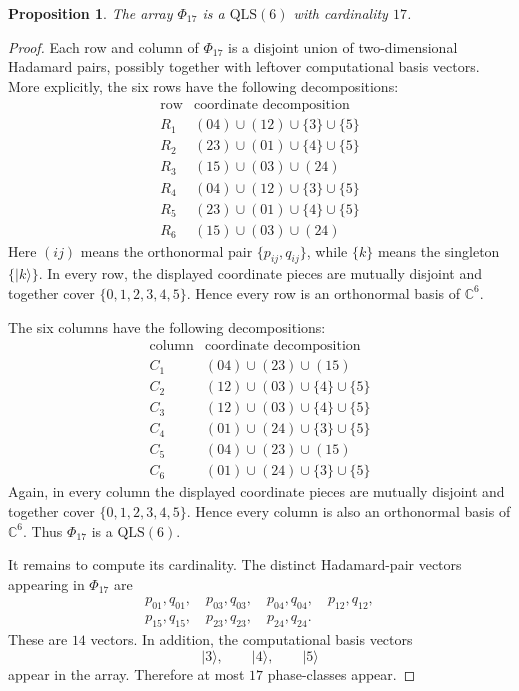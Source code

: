 \documentclass[a4paper,11pt]{article}
\newcommand{\C}{\mathbb{C}}
\newcommand{\ket}[1]{\lvert #1\rangle}
\newcommand{\QLS}{\mathrm{QLS}}
\newtheorem{proposition}{Proposition}
\begin{document}
\begin{proposition}
The array $\Phi_{17}$ is a $\QLS(6)$ with cardinality $17$.
\end{proposition}

\begin{proof}
Each row and column of $\Phi_{17}$ is a disjoint union of two-dimensional
Hadamard pairs, possibly together with leftover computational basis vectors.
More explicitly, the six rows have the following decompositions:
\[
\begin{array}{c|c}
\text{row} & \text{coordinate decomposition} \\\hline
R_1 & (04)\cup(12)\cup\{3\}\cup\{5\}\\
R_2 & (23)\cup(01)\cup\{4\}\cup\{5\}\\
R_3 & (15)\cup(03)\cup(24)\\
R_4 & (04)\cup(12)\cup\{3\}\cup\{5\}\\
R_5 & (23)\cup(01)\cup\{4\}\cup\{5\}\\
R_6 & (15)\cup(03)\cup(24)
\end{array}
\]
Here $(ij)$ means the orthonormal pair $\{p_{ij},q_{ij}\}$, while $\{k\}$ means
the singleton $\{\ket{k}\}$. In every row, the displayed coordinate pieces are
mutually disjoint and together cover $\{0,1,2,3,4,5\}$. Hence every row is an
orthonormal basis of $\C^6$.

The six columns have the following decompositions:
\[
\begin{array}{c|c}
\text{column} & \text{coordinate decomposition} \\\hline
C_1 & (04)\cup(23)\cup(15)\\
C_2 & (12)\cup(03)\cup\{4\}\cup\{5\}\\
C_3 & (12)\cup(03)\cup\{4\}\cup\{5\}\\
C_4 & (01)\cup(24)\cup\{3\}\cup\{5\}\\
C_5 & (04)\cup(23)\cup(15)\\
C_6 & (01)\cup(24)\cup\{3\}\cup\{5\}
\end{array}
\]
Again, in every column the displayed coordinate pieces are mutually disjoint and
together cover $\{0,1,2,3,4,5\}$. Hence every column is also an orthonormal basis
of $\C^6$. Thus $\Phi_{17}$ is a $\QLS(6)$.

It remains to compute its cardinality. The distinct Hadamard-pair vectors
appearing in $\Phi_{17}$ are
\[
\begin{gathered}
  p_{01},q_{01},\quad p_{03},q_{03},\quad p_{04},q_{04},\quad
  p_{12},q_{12},\\
  p_{15},q_{15},\quad p_{23},q_{23},\quad p_{24},q_{24}.
\end{gathered}
\]
These are $14$ vectors. In addition, the computational basis vectors
\[
  \ket{3},\qquad \ket{4},\qquad \ket{5}
\]
appear in the array. Therefore at most $17$ phase-classes appear.


\end{proof}
\end{document}
